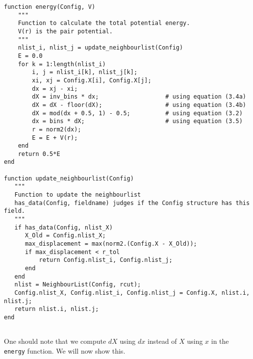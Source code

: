 \documentclass[a4paper]{article}
\begin{document}
\begin{verbatim}
function energy(Config, V)
    """
    Function to calculate the total potential energy.
    V(r) is the pair potential.
    """
    nlist_i, nlist_j = update_neighbourlist(Config)
    E = 0.0
    for k = 1:length(nlist_i)
        i, j = nlist_i[k], nlist_j[k];
        xi, xj = Config.X[i], Config.X[j];
        dx = xj - xi;
        dX = inv_bins * dx;                   # using equation (3.4a)
        dX = dX - floor(dX);                  # using equation (3.4b)
        dX = mod(dx + 0.5, 1) - 0.5;          # using equation (3.2)
        dx = bins * dX;                       # using equation (3.5)
        r = norm2(dx);
        E = E + V(r);
    end
    return 0.5*E
end

function update_neighbourlist(Config)
   """
   Function to update the neighbourlist
   has_data(Config, fieldname) judges if the Config structure has this field.
   """
   if has_data(Config, nlist_X)
      X_Old = Config.nlist_X;
      max_displacement = max(norm2.(Config.X - X_Old));
      if max_displacement < r_tol
          return Config.nlist_i, Config.nlist_j;
      end
   end
   nlist = NeighbourList(Config, rcut);
   Config.nlist_X, Config.nlist_i, Config.nlist_j = Config.X, nlist.i, nlist.j;
   return nlist.i, nlist.j;
end
   
\end{verbatim}

One should note that we compute $dX$ using $dx$ instead of $X$ using $x$ in the \texttt{energy} function. We will now show this.
\end{document}
